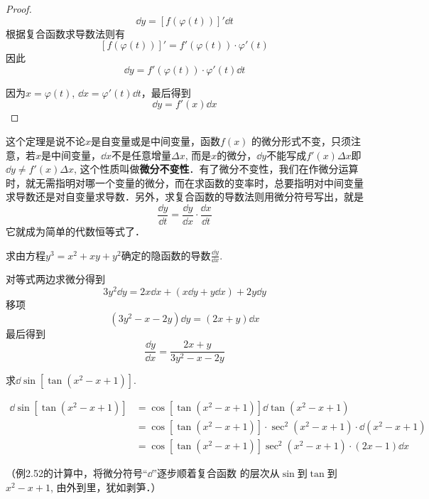 \begin{proof}
   \[ \dd y=[f(\varphi (t))]'\dd t\]
根据复合函数求导数法则有
\[[f (\varphi  (t) ) ] '=f' (\varphi  (t) ) \cdot \varphi ' (t)\]
因此
\[\dd y=f' (\varphi  (t) ) \cdot \varphi' (t) \dd t\]

因为$x=\varphi  (t)$, $\dd x=\varphi ' (t) \dd t$，最后得到
\[\dd y=f' (x) \dd x\]
\end{proof}

这个定理是说不论$x$是自变量或是中间变量，函数$f(x)$
的微分形式不变，只须注意，若$x$是中间变量，$\dd x$不是任意增量$\Delta x$, 而是$x$的微分，$\dd y$不能写成$f'(x)\Delta x$即$\dd y\ne f'(x)\Delta x$, 这个性质叫做\textbf{微分不变性}．有了微分不变性，我们在作微分运算时，就无需指明对哪一个变量的微分，而在求函数的变率时，总要指明对中间变量求导数还是对自变量求导数．另外，求复合函数的导数法则用微分符号写出，就是
\[\frac{\dd y}{\dd t}=\frac{\dd y}{\dd x}\cdot \frac{\dd x}{\dd t}\]
它就成为简单的代数恒等式了．

\begin{example}
    求由方程$y^3=x^2+xy+y^2$确定的隐函数的导数$\frac{\dd y}{\dd x}$.
\end{example}

\begin{solution}
    对等式两边求微分得到
\[3y^2\dd y=2x\dd x+ (x\dd y+y\dd x) +2y\dd y\]
移项
\[(3y^2-x-2y)\dd y=(2x+y)\dd x\]
最后得到
\[\frac{\dd y}{\dd x}=\frac{2x+y}{3y^2-x-2y}\]
\end{solution}

\begin{example}
    求$\dd\sin [\tan(x^2-x+1)]$.
\end{example}


\begin{solution}
\begin{align*}
    \dd\sin \left[\tan(x^2-x+1)\right]&=\cos\left[\tan(x^2-x+1)\right]\dd \tan(x^2-x+1)\\
    &=\cos\left[\tan(x^2-x+1)\right]\cdot \sec^2 (x^2-x+1)\cdot \dd (x^2-x+1)\\
    &=\cos\left[\tan(x^2-x+1)\right]\sec^2(x^2-x+1)\cdot (2x-1)\dd x 
\end{align*}
\end{solution}
（例2.52的计算中，将微分符号“$\dd$”逐步顺着复合函数
的层次从$\sin$到$\tan$到$x^2-x+1$, 由外到里，犹如剥笋．）


